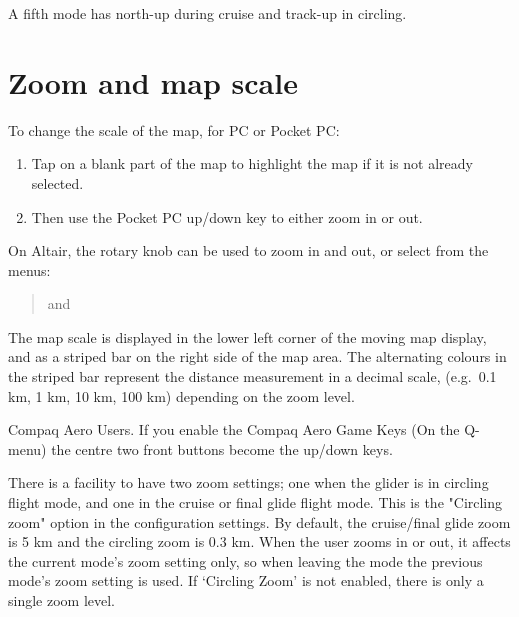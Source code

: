 \documentclass[a4paper,12pt]{refrep}
\begin{document}
A fifth mode has north-up during cruise and track-up in circling.

\section{Zoom and map scale}

To change the scale of the map, for PC or Pocket PC:
\begin{enumerate}
\item Tap on a blank part of the map to highlight the map if it is not already selected.
\item Then use the Pocket PC up/down key to either zoom in or out.
\end{enumerate}

On Altair, the rotary knob can be used to zoom in and out, or select
from the menus:
\begin{quote}
\blink{} and \blink{}
\end{quote}

The map scale is displayed in the lower left corner of the moving map
display, and as a striped bar on the right side of the map area.  The
alternating colours in the striped bar represent the distance
measurement in a decimal scale, (e.g.\ 0.1 km, 1 km, 10 km, 100 km)
depending on the zoom level.

Compaq Aero Users. If you enable the Compaq Aero Game Keys (On the
Q-menu) the centre two front buttons become the up/down keys.

There is a facility to have two zoom settings; one when the glider is
in circling flight mode, and one in the cruise or final glide flight
mode.  This is the "Circling zoom" option in the configuration
settings.  
By default, the cruise/final glide zoom is  5 km and the
circling zoom is 0.3 km.
When the user zooms in or out, it affects the current
mode's zoom setting only, so when leaving the mode the previous mode's
zoom setting is used.  If `Circling Zoom' is not enabled, there is
only a single zoom level.
\end{document}
